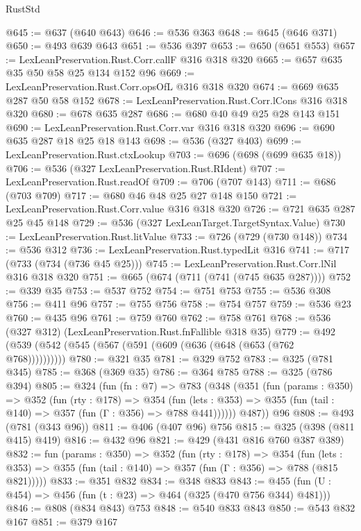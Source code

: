 \begin{lexlean}{RustStd}
\begin{coremodule}
@645 := @637 (@640 @643)
@646 := @536 @363
@648 := @645 (@646 @371)
@650 := @493 @639 @643
@651 := @536 @397
@653 := @650 (@651 @553)
@657 := LexLeanPreservation.Rust.Corr.callF @316 @318 @320
@665 := @657 @635 @35 @50 @58 @25 @134 @152 @96
@669 := LexLeanPreservation.Rust.Corr.opsOfL @316 @318 @320
@674 := @669 @635 @287 @50 @58 @152
@678 := LexLeanPreservation.Rust.Corr.lCons @316 @318 @320
@680 := @678 @635 @287
@686 := @680 @40 @49 @25 @28 @143 @151
@690 := LexLeanPreservation.Rust.Corr.var @316 @318 @320
@696 := @690 @635 @287 @18 @25 @18 @143
@698 := @536 (@327 @403)
@699 := LexLeanPreservation.Rust.ctxLookup
@703 := @696 (@698 (@699 @635 @18))
@706 := @536 (@327 LexLeanPreservation.Rust.RIdent)
@707 := LexLeanPreservation.Rust.readOf
@709 := @706 (@707 @143)
@711 := @686 (@703 @709)
@717 := @680 @46 @48 @25 @27 @148 @150
@721 := LexLeanPreservation.Rust.Corr.value @316 @318 @320
@726 := @721 @635 @287 @25 @45 @148
@729 := @536 (@327 LexLeanTarget.TargetSyntax.Value)
@730 := LexLeanPreservation.Rust.litValue
@733 := @726 (@729 (@730 @148))
@734 := @536 @312
@736 := LexLeanPreservation.Rust.typedLit @316
@741 := @717 (@733 (@734 (@736 @45 @25)))
@745 := LexLeanPreservation.Rust.Corr.lNil @316 @318 @320
@751 := @665 (@674 (@711 (@741 (@745 @635 @287))))
@752 := @339 @35
@753 := @537 @752
@754 := @751 @753
@755 := @536 @308
@756 := @411 @96
@757 := @755 @756
@758 := @754 @757
@759 := @536 @23
@760 := @435 @96
@761 := @759 @760
@762 := @758 @761
@768 := @536 (@327 @312) (LexLeanPreservation.Rust.fnFallible @318 @35)
@779 := @492 (@539 (@542 (@545 (@567 (@591 (@609 (@636 (@648 (@653 (@762 @768))))))))))
@780 := @321 @35
@781 := @329 @752
@783 := @325 (@781 @345)
@785 := @368 (@369 @35)
@786 := @364 @785
@788 := @325 (@786 @394)
@805 := @324
    (fun (fn : @7) =>
    @783
      (@348
        (@351
          (fun (params : @350) =>
          @352
            (fun (rty : @178) =>
            @354
              (fun (lets : @353) =>
              @355 (fun (tail : @140) => @357 (fun (Γ : @356) => @788 @441))))))
        @487))
    @96
@808 := @493 (@781 (@343 @96))
@811 := @406 (@407 @96) @756
@815 := @325 (@398 (@811 @415) @419)
@816 := @432 @96
@821 := @429 (@431 @816 @760 @387 @389)
@832 := fun (params : @350) =>
  @352
    (fun (rty : @178) =>
    @354
      (fun (lets : @353) => @355 (fun (tail : @140) => @357 (fun (Γ : @356) => @788 (@815 @821)))))
@833 := @351 @832
@834 := @348 @833
@843 := @455 (fun (U : @454) => @456 (fun (t : @23) => @464 (@325 (@470 @756 @344) @481)))
@846 := @808 (@834 @843) @753
@848 := @540 @833 @843
@850 := @543 @832 @167
@851 := @379 @167

\end{coremodule}
\end{lexlean}
